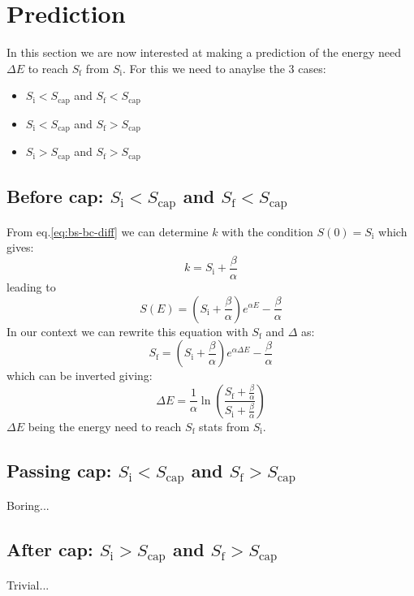 \documentclass[12pt]{article}
\def\Sc{S_\text{cap}}
\def\Si{S_\text{i}}
\def\Sf{S_\text{f}}
\begin{document}
\section{Prediction}
In this section we are now interested at making a prediction of the energy need $\Delta E$ to reach $\Sf$ from $\Si$. For this we need to anaylse the 3 cases:
\begin{itemize}
    \item $\Si < \Sc$ and $\Sf < \Sc$
    \item $\Si < \Sc$ and $\Sf > \Sc$
    \item $\Si > \Sc$ and $\Sf > \Sc$
\end{itemize}
\subsection{Before cap: $\Si < \Sc$ and $\Sf < \Sc$}
From eq.\eqref{eq:bs-bc-diff} we can determine $k$ with the condition $S(0) = \Si$ which gives:
\begin{equation}
    k = \Si + \frac{\beta}{\alpha}
\end{equation}
leading to
\begin{equation}
    S(E) = \left(\Si + \frac{\beta}{\alpha}\right)e^{\alpha E} - \frac{\beta}{\alpha}
\end{equation}
In our context we can rewrite this equation with $\Sf$ and $\Delta$ as:
\begin{equation}
    \Sf = \left(\Si + \frac{\beta}{\alpha}\right)e^{\alpha \Delta E} - \frac{\beta}{\alpha}
\end{equation}
which can be inverted giving:
\begin{equation}
    \Delta E = \frac{1}{\alpha} \ln\left( \frac{\Sf + \frac{\beta}{\alpha}}{\Si + \frac{\beta}{\alpha}} \right)
\end{equation}
$\Delta E$ being the energy need to reach $\Sf$ stats from $\Si$.

\subsection{Passing cap: $\Si < \Sc$ and $\Sf > \Sc$}
Boring...
\subsection{After cap: $\Si > \Sc$ and $\Sf > \Sc$}
Trivial...
\end{document}

